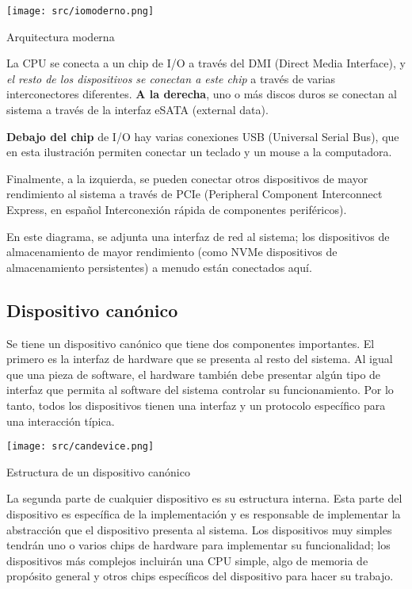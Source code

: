 \documentclass[openany]{book}
\begin{document}
\begin{floatingfigure}[r]{0.5\textwidth}
    \texttt{[image: src/iomoderno.png]}
    \caption{Arquitectura moderna}
\end{floatingfigure}

La CPU \colorbox{yellow!20}{se conecta a un chip de I/O} a través del DMI (Direct Media Interface), y \textit{el resto de los dispositivos se conectan a este chip} a través de varias interconectores diferentes. 
\textbf{A la derecha}, uno o más \colorbox{yellow!20}{discos duros} se conectan al sistema a través de la interfaz eSATA (external data). 

\textbf{Debajo del chip} de I/O hay varias \colorbox{yellow!20}{conexiones USB} (Universal Serial Bus), que en esta ilustración permiten conectar un teclado y un mouse a la computadora. 

Finalmente, a la izquierda, se pueden conectar otros \colorbox{yellow!20}{dispositivos de mayor rendimiento} al sistema a través de PCIe (Peripheral Component Interconnect Express, en español Interconexión rápida de componentes periféricos). 

En este diagrama, se adjunta una interfaz de red al sistema; los dispositivos de almacenamiento de mayor rendimiento (como NVMe dispositivos de almacenamiento persistentes) a menudo están conectados aquí.

\newpage
\subsection{Dispositivo canónico}

Se tiene un dispositivo canónico que tiene dos componentes importantes. El primero es la \colorbox{yellow!20}{interfaz de hardware} que se presenta al resto del sistema. Al igual que una pieza de software, el hardware también debe presentar algún tipo de interfaz que permita al software del sistema controlar su funcionamiento. Por lo tanto, todos los dispositivos tienen una interfaz y un protocolo específico para una interacción típica.

\begin{floatingfigure}[r]{0.5\textwidth}
    \texttt{[image: src/candevice.png]}
    \caption{Estructura de un dispositivo canónico}
\end{floatingfigure}

La segunda parte de cualquier dispositivo es su \colorbox{yellow!20}{estructura interna}. Esta parte del dispositivo es específica de la implementación y es responsable de implementar la abstracción que el dispositivo presenta al sistema. Los dispositivos muy simples tendrán uno o varios chips de hardware para implementar su funcionalidad; los dispositivos más complejos incluirán una CPU simple, algo de memoria de propósito general y otros chips específicos del dispositivo para hacer su trabajo.
\end{document}
